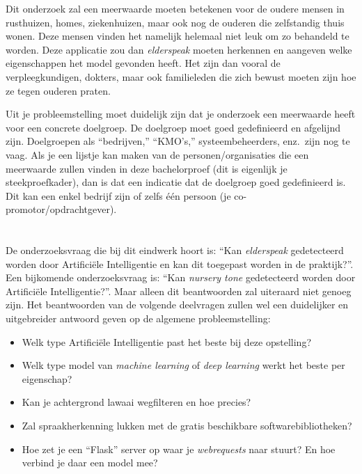 Dit onderzoek zal een meerwaarde moeten betekenen voor de oudere mensen in rusthuizen, homes, ziekenhuizen, maar ook nog de ouderen die zelfstandig thuis wonen. Deze mensen vinden het namelijk helemaal niet leuk om zo behandeld te worden. Deze applicatie zou dan \textit{elderspeak} moeten herkennen en aangeven welke eigenschappen het model gevonden heeft. Het zijn dan vooral de verpleegkundigen, dokters, maar ook familieleden die zich bewust moeten zijn hoe ze tegen ouderen praten.


\color{blue}
Uit je probleemstelling moet duidelijk zijn dat je onderzoek een meerwaarde heeft voor een concrete doelgroep. De doelgroep moet goed gedefinieerd en afgelijnd zijn. Doelgroepen als ``bedrijven,'' ``KMO's,'' systeembeheerders, enz.~zijn nog te vaag. Als je een lijstje kan maken van de personen/organisaties die een meerwaarde zullen vinden in deze bachelorproef (dit is eigenlijk je steekproefkader), dan is dat een indicatie dat de doelgroep goed gedefinieerd is. Dit kan een enkel bedrijf zijn of zelfs één persoon (je co-promotor/opdrachtgever).

\color{black}

\section{}
\label{sec:onderzoeksvraag}

De onderzoeksvraag die bij dit eindwerk hoort is: ``Kan \textit{elderspeak} gedetecteerd worden door Artificiële Intelligentie en kan dit toegepast worden in de praktijk?''. Een bijkomende onderzoeksvraag is: ``Kan \textit{nursery tone} gedetecteerd worden door Artificiële Intelligentie?''. Maar alleen dit beantwoorden zal uiteraard niet genoeg zijn. Het beantwoorden van de volgende deelvragen zullen wel een duidelijker en uitgebreider antwoord geven op de algemene probleemstelling:
\begin{itemize}
    \item Welk type Artificiële Intelligentie past het beste bij deze opstelling?
    \item Welk type model van \textit{machine learning} of \textit{deep learning} werkt het beste per eigenschap?
    \item Kan je achtergrond lawaai wegfilteren en hoe precies?
    \item Zal spraakherkenning lukken met de gratis beschikbare softwarebibliotheken?
    \item Hoe zet je een ``Flask'' server op waar je \textit{webrequests} naar stuurt? En hoe verbind je daar een model mee?
\end{itemize}

